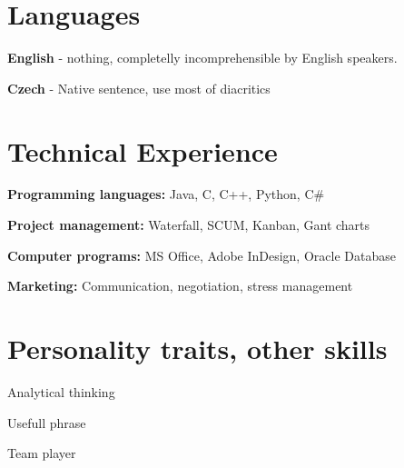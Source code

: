 \documentclass[letterpaper]{article}
\renewenvironment{itemize}{
  \begin{list}{}{
    \setlength{\leftmargin}{1.5em}
  }
}{
  \end{list}
}
\begin{document}
\section*{Languages}
\begin{itemize}
 \item {\bf English} - nothing, completelly incomprehensible by English speakers.
 \item {\bf Czech} - Native sentence, use most of diacritics
\end{itemize}

\section*{Technical Experience}
\begin{itemize}
 \item {\bf Programming languages:} Java, C, C++, Python, C\#
 \item {\bf Project management:} Waterfall, SCUM, Kanban, Gant charts
 \item {\bf Computer programs:} MS Office, Adobe InDesign, Oracle Database
 \item {\bf Marketing:} Communication, negotiation, stress management
\end{itemize}

\section*{Personality traits, other skills}
\begin{itemize}
 \item Analytical thinking
 \item Usefull phrase
 \item Team player

\end{itemize}
\end{document}

